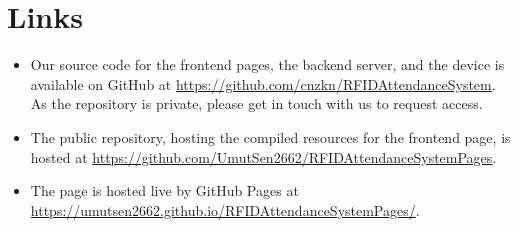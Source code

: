 \documentclass[12pt]{article}
\begin{document}
\newpage
\printbibliography[title={References}]



\newpage
\appendix
\section{Links}\label{apx:links}
\begin{itemize}
    \item Our source code for the frontend pages, the backend server, and the device is available on GitHub at \url{https://github.com/cnzkn/RFIDAttendanceSystem}. As the repository is private, please get in touch with us to request access.\par
    \item The public repository, hosting the compiled resources for the frontend page, is hosted at \url{https://github.com/UmutSen2662/RFIDAttendanceSystemPages}.\par
    \item The page is hosted live by GitHub Pages at \\\url{https://umutsen2662.github.io/RFIDAttendanceSystemPages/}.
\end{itemize}
\end{document}
